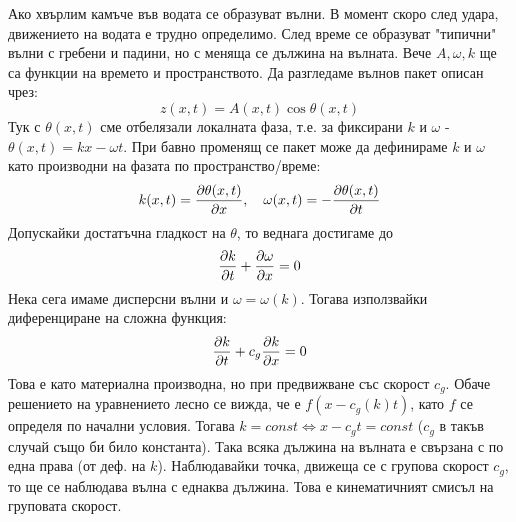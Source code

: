 Ако хвърлим камъче във водата се образуват вълни.
В момент скоро след удара, движението на водата е трудно определимо.
След време се образуват "типични" вълни с гребени и падини, но с меняща се дължина на вълната.
Вече $A, \omega, k$ ще са функции на времето и пространството.
Да разгледаме вълнов пакет описан чрез:
\begin{equation*}
  z(x, t) = A(x, t) \cos \theta(x, t)
\end{equation*}
Тук с $\theta (x, t)$ сме отбелязали локалната фаза, т.е. за фиксирани $k$ и $\omega$ - $\theta (x, t) = k x -  \omega t$.
При бавно променящ се пакет може да дефинираме $k$ и $\omega$ като производни на фазата по пространство/време:
\begin{equation*}
  k(x, t) = \pdv{\theta(x, t)}{x}, \quad  \omega(x, t) = -\pdv{\theta(x, t)}{t}
\end{equation*}
Допускайки достатъчна гладкост на $\theta$, то веднага достигаме до
\begin{equation*}
  \pdv{k}{t} + \pdv{\omega}{x} = 0
\end{equation*}
Нека сега имаме дисперсни вълни и $\omega = \omega (k)$.
Тогава използвайки диференциране на сложна функция:
\begin{equation}
  \pdv{k}{t} + c_g\pdv{k}{x} = 0
\end{equation}
Това е като материална производна, но при предвижване със скорост $c_g$.
Обаче решението на уравнението лесно се вижда, че е $f(x - c_g(k) t)$, като $f$ се определя по начални условия.
Тогава $k = const \iff x - c_g t = const$ ($c_g$ в такъв случай също би било константа).
Така всяка дължина на вълната е свързана с по една права (от деф. на $k$).
Наблюдавайки точка, движеща се с групова скорост $c_g$, то ще се наблюдава вълна с еднаква дължина.
Това е кинематичният смисъл на груповата скорост.

